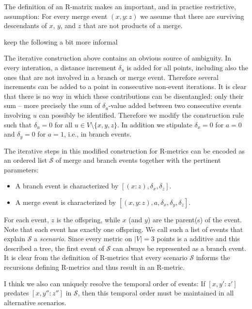 \documentclass[amsmath]{lni}
\newcommand{\TODO}[1]{\begingroup\color{red}#1\endgroup}
\begin{document}
The definition of an R-matrix makes an important, and in practise
restrictive, assumption: For every merge event $(x,y:z)$ we assume that
there are surviving descendants of $x$, $y$, and $z$ that are not products
of a merge.


\TODO{keep the following a bit more informal} 


The iterative construction above contains an obvious source of ambiguity.
In every interation, a distance increment $\delta_u$ is added for all
points, including also the ones that are not involved in a branch or merge
event. Therefore several increments can be added to a point in consecutive
non-event iterations. It is clear that there is no way in which these
contributions can be disentangled: only their sum -- more precisely the sum
of $\delta_u$-value added between two consecutive events involving $u$ can
possibly be identified. Therefore we modify the construction rule such that
$\delta_u=0$ for all $u\in V\setminus\{x,y,z\}$. In addition we stipulate
$\delta_x=0$ for $a=0$ and $\delta_y=0$ for $a=1$, i.e., in branch events.

The iterative steps in this modified construction for R-metrics can be
encoded as an ordered list $\mathcal{S}$ of merge and branch
events together with the pertinent parameters: \\
\begin{itemize} 
\item[] A branch event is characterized by $[(x:z),\delta_x,\delta_z]$.
\item[] A merge event is characterized by
  $[(x,y:z),a,\delta_x,\delta_y,\delta_z]$.
\end{itemize}
For each event, $z$ is the offspring, while $x$ (and $y$) are the parent(s)
of the event. Note that each event has exactly one offspring. We call such
a list of events that explain $\mathcal{S}$ a \emph{scenario}.  Since every
metric on $|V|=3$ points is a additive and this described a tree, the first
event of $\mathcal{S}$ can always be represented as a branch event. It is
clear from the definition of R-metrics that every scenario $\mathcal{S}$
informs the recursions defining R-metrics and thus result in an R-metric.

\TODO{I think we also can uniquely resolve the temporal order of events:
  If $[x,y':z']$ predates $[x,y'':z'']$ in $\mathcal{S}$, then this
  temporal order must be maintained in all alternative scenarios.}
\end{document}
